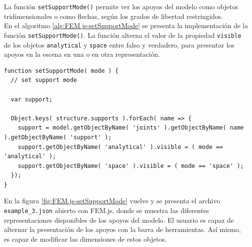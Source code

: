 La función \verb|setSupportMode()| permite ver los apoyos del modelo como objetos tridimensionales o como flechas, según los grados de libertad restringidos.\\

En el algoritmo \ref{alg:FEM.js-setSupportMode} se presenta la implementación de la función \verb|setSupportMode()|. La función alterna el valor de la propiedad \verb|visible| de los objetos \verb|analytical| y \verb|space| entre falso y verdadero, para presentar los apoyos en la escena en una o en otra representación.\\

\begin{lstlisting}[language={},caption=Función \texttt{setSupportMode()} implementada en el archivo \texttt{FEM.js}.,label=alg:FEM.js-setSupportMode, frame=single]
function setSupportMode( mode ) {
  // set support mode

  var support;

  Object.keys( structure.supports ).forEach( name => {
    support = model.getObjectByName( 'joints' ).getObjectByName( name ).getObjectByName( 'support' );
    support.getObjectByName( 'analytical' ).visible = ( mode == 'analytical' );
    support.getObjectByName( 'space' ).visible = ( mode == 'space' );
  });
}
\end{lstlisting}
\bigskip

En la figura \ref{fig:FEM.js-setSupportMode} vuelve y se presenta el archivo \verb|example_3.json| abierto con FEM.js, donde se muestra las diferentes representaciones disponibles de los apoyos del modelo. El usuario es capaz de alternar la presentación de los apoyos con la barra de herramientas. Así mismo, es capaz de modificar las dimensiones de estos objetos.\\

